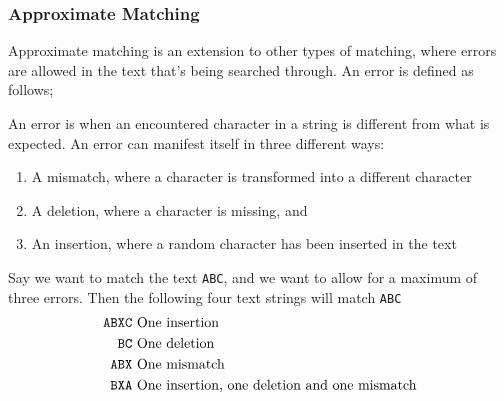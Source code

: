   \subsubsection{Approximate Matching}
   Approximate matching is an extension to other types of matching, where errors 
   are allowed in the text that's being searched through. An error is defined as 
   follows;
   \begin{mydef}\centering
    An error is when an encountered character in a string is different from 
    what is expected. An error can manifest itself in three different ways:
    \begin{enumerate}
    \item A mismatch, where a character is transformed into a different character
    \item A deletion, where a character is missing, and
    \item An insertion, where a random character has been inserted in the text
    \end{enumerate}
   \end{mydef}
   \begin{myex}\centering
    Say we want to match the text {\tt ABC}, and we want to allow for a 
    maximum of three errors. Then the following four text strings will match 
    {\tt ABC}
    \begin{align*}
    {\tt ABXC}&~\text{One insertion}\\
    {\tt BC}&~\text{One deletion}\\
    {\tt ABX}&~\text{One mismatch}\\
    {\tt BXA}&~\text{One insertion, one deletion and one mismatch}
    \end{align*}
   \end{myex}
   \begin{comment}
   While it is possible to perform approximate matching with regular expressions, it is not 
   a computationally efficient thing to do unless it is done on a regex-engine 
   that natively supports approximate matching. This is because the complexity 
   and size of a regular expression increases dramatically when mismatches and 
   insertions are hardcoded for regex, as shown by example \ref{exInsert}
   \begin{myex}\label{exInsert}
   Let {\tt ABCD} be a pattern that we wish to search a text for, where we 
   allow for one insertion. Then the resulting regular expression will be \\
   \begin{center}
   {\tt .ABCD$|$A.BCD$|$AB.CD$|$ABC.D$|$ABCD.$|$ABCD}
   \end{center}
   \end{myex}
   Allowing one insertion in our 4-character text results in six possible 
   permutations that must be accounted for, and the blowup of the regular 
   expression's size only increases as we try to match longer strings with more 
   insertions.
   \end{comment}
